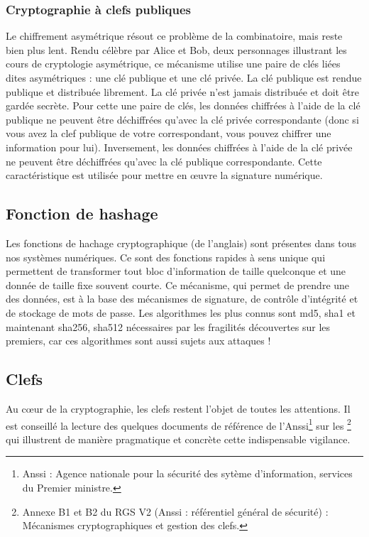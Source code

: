 \subsubsection{Cryptographie à clefs publiques}
Le chiffrement asymétrique résout ce problème de la combinatoire, mais reste bien plus lent. Rendu célèbre par Alice et Bob, deux personnages illustrant les cours de cryptologie asymétrique, ce mécanisme utilise une paire de clés liées dites asymétriques : une clé publique et une clé privée. La clé publique est rendue publique et distribuée librement. La clé privée n'est jamais distribuée et doit être gardée secrète. Pour cette une paire de clés, les données chiffrées à l'aide de la clé publique ne peuvent être déchiffrées qu'avec la clé privée correspondante (donc si vous avez la clef publique de votre correspondant, vous pouvez chiffrer une information pour lui). Inversement, les données chiffrées à l'aide de la clé privée ne peuvent être déchiffrées qu'avec la clé publique correspondante. Cette caractéristique est utilisée pour mettre en œuvre la signature numérique.





\subsection{Fonction de hashage}

Les fonctions de hachage cryptographique (de l'anglais) sont présentes dans tous nos systèmes numériques. Ce sont des fonctions rapides à sens unique qui permettent de transformer tout bloc d'information de taille quelconque et une donnée de taille fixe souvent courte. Ce mécanisme, qui permet de prendre une des données, est à la base des mécanismes de signature, de contrôle d'intégrité et de stockage de mots de passe. Les algorithmes les plus connus sont md5, sha1 et maintenant sha256, sha512 nécessaires par les fragilités découvertes sur les premiers, car ces algorithmes sont aussi sujets aux attaques !


\subsection{Clefs}
Au cœur de la cryptographie, les clefs restent l'objet de toutes les attentions. Il est conseillé la lecture des quelques documents de référence de l'Anssi\footnote{Anssi : Agence nationale pour la sécurité des sytème d'information, services du Premier ministre.} sur les \footnote{Annexe B1 et B2 du RGS V2 (Anssi : référentiel général de sécurité) : Mécanismes cryptographiques et gestion des clefs.} qui illustrent de manière pragmatique et concrète cette indispensable vigilance.
